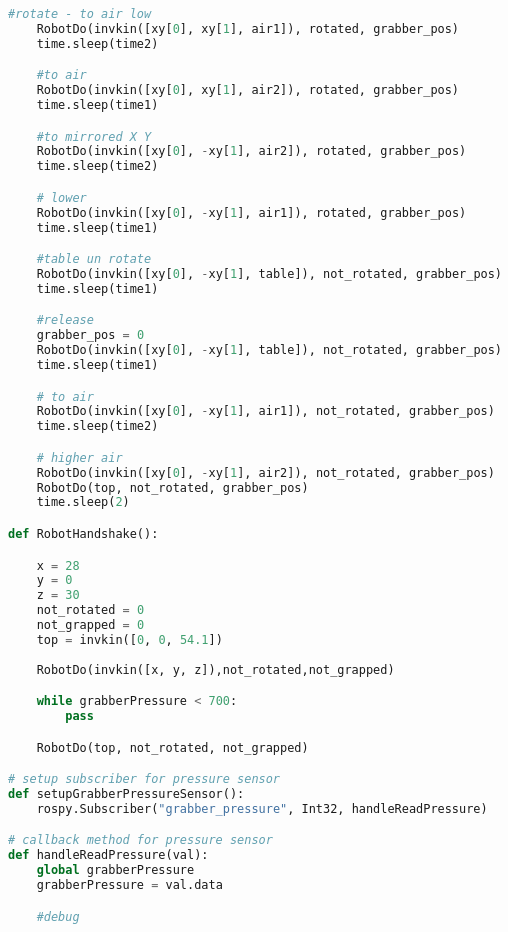 \begin{lstlisting}[language=Python]
    #rotate - to air low
    RobotDo(invkin([xy[0], xy[1], air1]), rotated, grabber_pos)
    time.sleep(time2)

    #to air 
    RobotDo(invkin([xy[0], xy[1], air2]), rotated, grabber_pos)
    time.sleep(time1)

    #to mirrored X Y
    RobotDo(invkin([xy[0], -xy[1], air2]), rotated, grabber_pos)
    time.sleep(time2)

    # lower
    RobotDo(invkin([xy[0], -xy[1], air1]), rotated, grabber_pos)
    time.sleep(time1)

    #table un rotate
    RobotDo(invkin([xy[0], -xy[1], table]), not_rotated, grabber_pos)
    time.sleep(time1)

    #release
    grabber_pos = 0
    RobotDo(invkin([xy[0], -xy[1], table]), not_rotated, grabber_pos)
    time.sleep(time1)

    # to air
    RobotDo(invkin([xy[0], -xy[1], air1]), not_rotated, grabber_pos)
    time.sleep(time2)

    # higher air
    RobotDo(invkin([xy[0], -xy[1], air2]), not_rotated, grabber_pos)
    RobotDo(top, not_rotated, grabber_pos)
    time.sleep(2)

def RobotHandshake():

    x = 28
    y = 0
    z = 30
    not_rotated = 0
    not_grapped = 0
    top = invkin([0, 0, 54.1])
    
    RobotDo(invkin([x, y, z]),not_rotated,not_grapped)

    while grabberPressure < 700:
        pass

    RobotDo(top, not_rotated, not_grapped)

# setup subscriber for pressure sensor
def setupGrabberPressureSensor():
    rospy.Subscriber("grabber_pressure", Int32, handleReadPressure)

# callback method for pressure sensor
def handleReadPressure(val):
    global grabberPressure
    grabberPressure = val.data

    #debug
\end{lstlisting}

